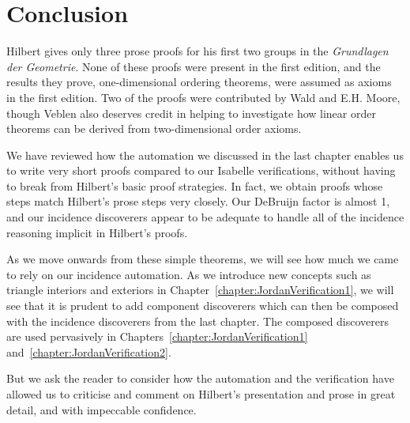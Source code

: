 \section{Conclusion}
Hilbert gives only three prose proofs for his first two groups in the \emph{Grundlagen der Geometrie}. None of these proofs were present in the first edition, and the results they prove, one-dimensional ordering theorems, were assumed as axioms in the first edition. Two of the proofs were contributed by Wald and E.H. Moore, though Veblen also deserves credit in helping to investigate how linear order theorems can be derived from  two-dimensional order axioms.

We have reviewed how the automation we discussed in the last chapter enables us to write very short proofs compared to our Isabelle verifications, without having to break from Hilbert's basic proof strategies. In fact, we obtain proofs whose steps match Hilbert's prose steps very closely. Our DeBruijn factor is almost 1, and our incidence discoverers appear to be adequate to handle all of the incidence reasoning implicit in Hilbert's proofs.

As we move onwards from these simple theorems, we will see how much we came to rely on our incidence automation. As we introduce new concepts such as triangle interiors and exteriors in Chapter~\ref{chapter:JordanVerification1}, we will see that it is prudent to add component discoverers which can then be composed with the incidence discoverers from the last chapter. The composed discoverers are used pervasively in Chapters~\ref{chapter:JordanVerification1} and~\ref{chapter:JordanVerification2}. 

But we ask the reader to consider how the automation and the verification have allowed us to criticise and comment on Hilbert's presentation and prose in great detail, and with impeccable confidence.

